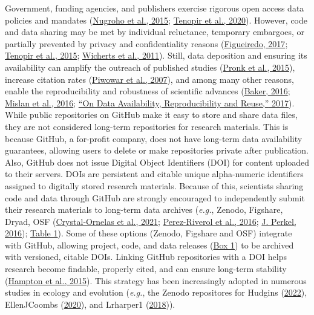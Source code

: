 Government, funding agencies, and publishers exercise rigorous open access data policies and mandates (\protect\hyperlink{ref-1Hcf13Q0k}{Nugroho et al., 2015}; \protect\hyperlink{ref-PLmDFZrm}{Tenopir et al., 2020}).
However, code and data sharing may be met by individual reluctance, temporary embargoes, or partially prevented by privacy and confidentiality reasons (\protect\hyperlink{ref-SLq38RVv}{Figueiredo, 2017}; \protect\hyperlink{ref-1CzUZwyU2}{Tenopir et al., 2015}; \protect\hyperlink{ref-1Ch6LSHef}{Wicherts et al., 2011}).
Still, data deposition and ensuring its availability can amplify the outreach of published studies (\protect\hyperlink{ref-666HppfO}{Pronk et al., 2015}), increase citation rates (\protect\hyperlink{ref-1CcAUn3Lu}{Piwowar et al., 2007}), and among many other reasons, enable the reproducibility and robustness of scientific advances (\protect\hyperlink{ref-1HZdsK5Kn}{Baker, 2016}; \protect\hyperlink{ref-uBJwnPbq}{Mislan et al., 2016}; \protect\hyperlink{ref-4LaijDIZ}{{``On Data Availability, Reproducibility and Reuse,''} 2017}).
While public repositories on GitHub make it easy to store and share data files, they are not considered long-term repositories for research materials.
This is because GitHub, a for-profit company, does not have long-term data availability guarantees, allowing users to delete or make repositories private after publication.
Also, GitHub does not issue Digital Object Identifiers (DOI) for content uploaded to their servers.
DOIs are persistent and citable unique alpha-numeric identifiers assigned to digitally stored research materials.
Because of this, scientists sharing code and data through GitHub are strongly encouraged to independently submit their research materials to long-term data archives (\emph{e.g.}, Zenodo, Figshare, Dryad, OSF (\protect\hyperlink{ref-1Du6fzB8g}{Crystal‐Ornelas et al., 2021}; \protect\hyperlink{ref-kEX5dgzK}{Perez-Riverol et al., 2016}; \protect\hyperlink{ref-10ghgV3S8}{J. Perkel, 2016}); \protect\hyperlink{tbl:compare}{Table 1}).
Some of these options (Zenodo, Figshare and OSF) integrate with GitHub, allowing project, code, and data releases (\protect\hyperlink{definitions}{Box 1}) to be archived with versioned, citable DOIs.
Linking GitHub repositories with a DOI helps research become findable, properly cited, and can ensure long-term stability (\protect\hyperlink{ref-iIEKCTLU}{Hampton et al., 2015}).
This strategy has been increasingly adopted in numerous studies in ecology and evolution (\emph{e.g.}, the Zenodo repositores for Hudgins (\protect\hyperlink{ref-GQj3c17f}{2022}), EllenJCoombs (\protect\hyperlink{ref-bZNn2hbh}{2020}), and Lrharper1 (\protect\hyperlink{ref-ZI1OqZNr}{2018})).

